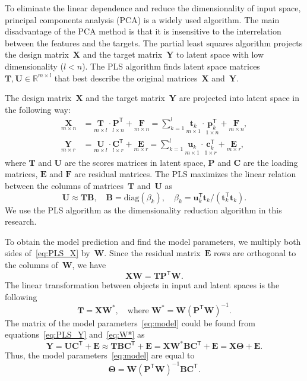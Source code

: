 \documentclass[preprint,authoryear,12pt]{elsarticle}
\theoremstyle{definition}
\newcommand{\bY}{\mathbf{Y}}
\newcommand{\bX}{\mathbf{X}}
\newcommand{\bu}{\mathbf{u}}
\newcommand{\bt}{\mathbf{t}}
\newcommand{\bp}{\mathbf{p}}
\newcommand{\bc}{\mathbf{c}}
\newcommand{\bP}{\mathbf{P}}
\newcommand{\bT}{\mathbf{T}}
\newcommand{\bB}{\mathbf{B}}
\newcommand{\bC}{\mathbf{C}}
\newcommand{\bE}{\mathbf{E}}
\newcommand{\bF}{\mathbf{F}}
\newcommand{\bU}{\mathbf{U}}
\newcommand{\bW}{\mathbf{W}}
\newcommand{\T}{\mathsf{T}}
\newcommand{\bTheta}{\boldsymbol{\Theta}}
\begin{document}
To eliminate the linear dependence and reduce the dimensionality of input space, principal components analysis (PCA) is a widely used algorithm. 
The main disadvantage of the PCA method is that it is insensitive to the interrelation between the features and the targets.
The partial least squares algorithm projects the design matrix~$\bX$ and the target matrix~$\bY$ to latent space with low dimensionality ($l < n$).
The PLS algorithm finds latent space matrices $\bT, \bU \in \mathbb{R}^{m \times l}$ that best describe the original matrices~$\bX$ and~$\bY$.

The design matrix~$\bX$ and the target matrix~$\bY$ are projected into latent space in the following way:
\begin{align}
\label{eq:PLS_X}
\underset{m \times n}{\bX} 
&= \underset{m \times l}{\bT} \cdot \underset{l \times n}{\bP^{\T}} + \underset{m \times n}{\bF} 
= \sum_{k=1}^l \underset{m \times 1}{\bt_k} \cdot \underset{1 \times n}{\bp_k^{\T}} + \underset{m \times n}{\bF},\\
\label{eq:PLS_Y}
\underset{m \times r}{\bY} 
&= \underset{m \times l}{\bU} \cdot \underset{l \times r}{\bC^{\T}} + \underset{m \times r}{\bE}
=  \sum_{k=1}^l  \underset{m \times 1}{\bu_k} \cdot \underset{1 \times r}{\bc_k^{\T}} +  \underset{m \times r}{\bE},
\end{align}
where $\bT$ and $\bU$ are the scores matrices in latent space, $\bP$ and $\bC$ are the loading matrices, $\bE$ and $\bF$ are residual matrices. The PLS maximizes the linear relation between the columns of matrices~$\bT$ and~$\bU$ as
\begin{equation*}
\bU \approx \bT \bB, \quad \bB = \text{diag}(\beta_k), \quad \beta_k = \bu_k^{\T}\bt_k / (\bt_k^{\T}\bt_k).
\end{equation*}
We use the PLS algorithm as the dimensionality reduction algorithm in this research.

To obtain the model prediction and find the model parameters, we multiply both sides of~\eqref{eq:PLS_X} by~$\bW$. 
Since the residual matrix~$\bE$ rows are orthogonal to the columns of~$\bW$, we have
\begin{equation*}
\bX \bW = \bT \bP^{\T} \bW.
\end{equation*}
The linear transformation between objects in input and latent spaces is the following
\begin{equation}
\bT = \bX \bW^*, \quad \text{where } \bW^* = \bW (\bP^{\T} \bW)^{-1}.
\label{eq:W*}
\end{equation}
The matrix of the model parameters~\eqref{eq:model} could be found from equations~\eqref{eq:PLS_Y} and~\eqref{eq:W*} as
\begin{equation}
\bY = \bU \bC^{\T} + \bE \approx \bT \bB \bC^{\T}+ \bE = \bX \bW^* \bB \bC^{\T} + \bE = \bX \bTheta + \bE.
\label{eq:pls_model}
\end{equation}
Thus, the model parameters~\eqref{eq:model} are equal to
\begin{equation*}
\bTheta = \bW (\bP^{\T} \bW)^{-1} \bB \bC^{\T}.
\end{equation*}
\end{document}
